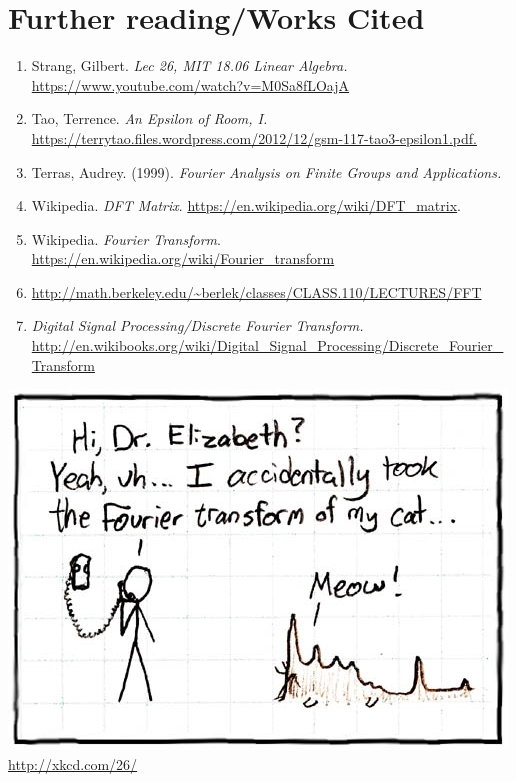 \documentclass[11pt]{article}
\begin{document}
\section{Further reading/Works Cited}
\begin{enumerate}
\item Strang, Gilbert. \emph{Lec 26, MIT 18.06 Linear Algebra.} \url{https://www.youtube.com/watch?v=M0Sa8fLOajA}
\item Tao, Terrence. \emph{An Epsilon of Room, I.} \url{https://terrytao.files.wordpress.com/2012/12/gsm-117-tao3-epsilon1.pdf.}
\item Terras, Audrey. (1999). \emph{Fourier Analysis on Finite Groups and Applications.}
\item Wikipedia. \emph{DFT Matrix}. \url{https://en.wikipedia.org/wiki/DFT_matrix}.
\item Wikipedia. \emph{Fourier Transform}. \url{https://en.wikipedia.org/wiki/Fourier_transform}
\item \url{http://math.berkeley.edu/~berlek/classes/CLASS.110/LECTURES/FFT}
\item \emph{Digital Signal Processing/Discrete Fourier Transform. } \url{http://en.wikibooks.org/wiki/Digital_Signal_Processing/Discrete_Fourier_Transform}
\end{enumerate}
\vfill
  \centering
 \includegraphics[scale=3]{fourier.jpg}\\
 \url{http://xkcd.com/26/}
\end{document}

